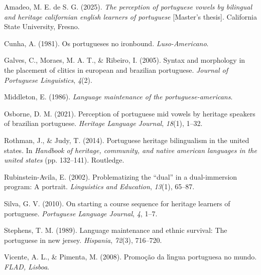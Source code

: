 \documentclass[
  letterpaper,
  DIV=11,
  numbers=noendperiod]{scrartcl}
\newlength{\cslhangindent}
\newenvironment{CSLReferences}[2] %
 {\begin{list}{}{%
  \setlength{\itemindent}{0pt}
  \setlength{\leftmargin}{0pt}
  \setlength{\parsep}{0pt}
  \ifodd #1
   \setlength{\leftmargin}{\cslhangindent}
   \setlength{\itemindent}{-1\cslhangindent}
  \fi
  \setlength{\itemsep}{#2\baselineskip}}}
 {\end{list}}
\begin{document}
\protect{}\label{refs}
\begin{CSLReferences}{1}{0}
Amadeo, M. E. de S. G. (2025). \emph{The perception of portuguese vowels
by bilingual and heritage californian english learners of portuguese}
{[}Master's thesis{]}. California State University, Fresno.

Cunha, A. (1981). Os portugueses no ironbound. \emph{Luso-Americano}.

Galves, C., Moraes, M. A. T., \& Ribeiro, I. (2005). Syntax and
morphology in the placement of clitics in european and brazilian
portuguese. \emph{Journal of Portuguese Linguistics}, \emph{4}(2).

Middleton, E. (1986). \emph{Language maintenance of the
portuguese-americans}.

Osborne, D. M. (2021). Perception of portuguese mid vowels by heritage
speakers of brazilian portuguese. \emph{Heritage Language Journal},
\emph{18}(1), 1--32.

Rothman, J., \& Judy, T. (2014). Portuguese heritage bilingualism in the
united states. In \emph{Handbook of heritage, community, and native
american languages in the united states} (pp. 132--141). Routledge.

Rubinstein-Avila, E. (2002). Problematizing the {``dual''} in a
dual-immersion program: A portrait. \emph{Linguistics and Education},
\emph{13}(1), 65--87.

Silva, G. V. (2010). On starting a course sequence for heritage learners
of portuguese. \emph{Portuguese Language Journal}, \emph{4}, 1--7.

Stephens, T. M. (1989). Language maintenance and ethnic survival: The
portuguese in new jersey. \emph{Hispania}, \emph{72}(3), 716--720.

Vicente, A. L., \& Pimenta, M. (2008). Promo{ç}{ã}o da l{ı́}ngua
portuguesa no mundo. \emph{FLAD, Lisboa}.

\end{CSLReferences}
\end{document}
